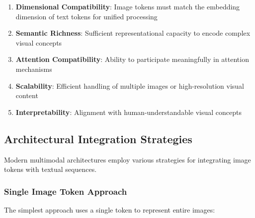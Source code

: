 \begin{enumerate}
\item \textbf{Dimensional Compatibility}: Image tokens must match the embedding dimension of text tokens for unified processing
\item \textbf{Semantic Richness}: Sufficient representational capacity to encode complex visual concepts
\item \textbf{Attention Compatibility}: Ability to participate meaningfully in attention mechanisms
\item \textbf{Scalability}: Efficient handling of multiple images or high-resolution visual content
\item \textbf{Interpretability}: Alignment with human-understandable visual concepts
\end{enumerate}

\subsection{Architectural Integration Strategies}

Modern multimodal architectures employ various strategies for integrating image tokens with textual sequences.

\subsubsection{Single Image Token Approach}

The simplest approach uses a single token to represent entire images:

